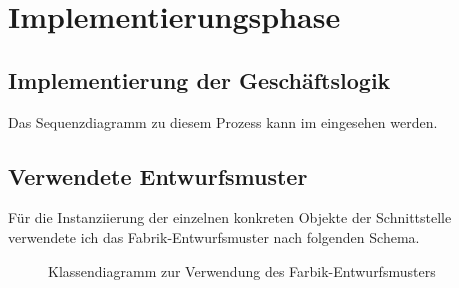 \clearpage
\section{Implementierungsphase} 
\label{sec:Implementierungsphase}

\subsection{Implementierung der Geschäftslogik}
\label{sec:ImplementierungGeschaeftslogik}


Das Sequenzdiagramm zu diesem Prozess kann im  eingesehen werden.

\subsection{Verwendete Entwurfsmuster}
\label{sec:Entwurfsmuster}

Für die Instanziierung der einzelnen konkreten Objekte der Schnittstelle  verwendete ich das Fabrik-Entwurfsmuster nach folgenden Schema.
\begin{figure}
	\caption{Klassendiagramm zur Verwendung des Farbik-Entwurfsmusters}
\end{figure}


%



